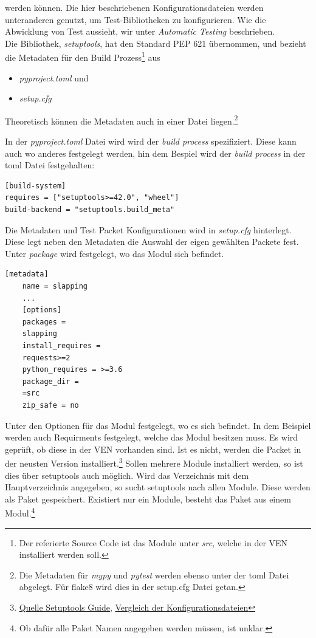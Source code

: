 werden können. Die hier beschriebenen Konfigurationsdateien werden unteranderen genutzt, um Test-Bibliotheken zu konfigurieren. Wie die Abwicklung von Test aussieht, wir unter \textit{Automatic Testing} beschrieben.\\

Die Bibliothek, \textit{setuptools}, hat den Standard PEP 621 übernommen, und bezieht die Metadaten für den Build Prozess\footnote{
	Der referierte Source Code ist das Module unter \textit{src}, welche in der \gls{VEN} installiert werden soll. 
} 
aus
\begin{itemize}
	\item \textit{pyproject.toml} und
	\item \textit{setup.cfg}
\end{itemize}
Theoretisch können die Metadaten auch in einer Datei liegen.\footnote{
Die Metadaten für \textit{mypy} und \textit{pytest} werden ebenso unter der toml Datei abgelegt. Für flake8 wird dies in der setup.cfg Datei getan.
}


In der \textit{pyproject.toml} Datei wird wird der \textit{build process} spezifiziert. Diese kann auch wo anderes festgelegt werden, hin dem Bespiel wird der \textit{build process} in der toml Datei festgehalten:
\begin{lstlisting}[style=Config]
[build-system]
requires = ["setuptools>=42.0", "wheel"]
build-backend = "setuptools.build_meta"
\end{lstlisting}

Die Metadaten und Test Packet Konfigurationen wird in \textit{setup.cfg} hinterlegt.
Diese legt neben den Metadaten die Auswahl der eigen gewählten Packete fest. Unter \textit{package} wird festgelegt, wo das Modul sich befindet.

\begin{lstlisting}[style=Config, caption={Beispiel Slapping Modul}, captionpos=b]
	[metadata]
	name = slapping
	...
	[options]
	packages =
	slapping
	install_requires =
	requests>=2
	python_requires = >=3.6
	package_dir =
	=src
	zip_safe = no
\end{lstlisting}

Unter den Optionen für das Modul festgelegt, wo es sich befindet. In dem Beispiel werden auch Requirments festgelegt, welche das Modul besitzen muss. Es wird geprüft, ob diese in der \gls{VEN} vorhanden sind. Ist es nicht, werden die Packet in der neusten Version installiert.\footnote{
	\href{https://setuptools.pypa.io/en/latest/userguide/declarative_config.html}{Quelle Setuptools Guide},
	\href{https://ianhopkinson.org.uk/2022/02/understanding-setup-py-setup-cfg-and-pyproject-toml-in-python/}{Vergleich der Konfigurationsdateien}
}
Sollen mehrere Module installiert werden, so ist dies über setuptools auch möglich. Wird das Verzeichnis mit dem Hauptverzeichnis angegeben, so sucht setuptools nach allen Module. Diese werden als Paket gespeichert. Existiert nur ein Module, besteht das Paket aus einem Modul.\footnote{
	Ob dafür alle Paket Namen angegeben werden müssen, ist unklar.
}


